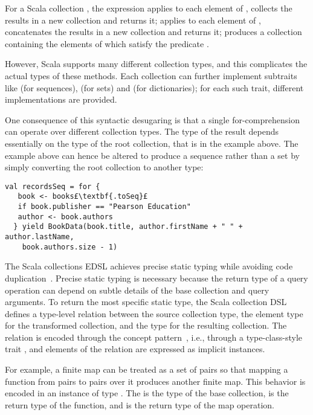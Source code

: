 For a Scala collection , the expression  applies  to each element of , collects the results in a new collection and returns it;  applies  to each element of , concatenates the results in a new collection and returns it;  produces a collection containing the elements of  which satisfy the predicate .

However, Scala supports many different collection types, and this complicates the actual types of these methods. Each collection can further implement subtraits like  (for sequences),  (for sets) and  (for dictionaries); for each such trait, different implementations are provided.

One consequence of this syntactic desugaring is that a single for-comprehension can operate over different collection types.
The type of the result depends essentially on the type of the root collection, that is  in the example above. The example above can hence be altered to produce a sequence rather than a set by simply converting the root collection to another type:
\begin{lstlisting}
val recordsSeq = for {
   book <- books£\textbf{.toSeq}£
   if book.publisher == "Pearson Education"
   author <- book.authors
  } yield BookData(book.title, author.firstName + " " + author.lastName,
    book.authors.size - 1)
\end{lstlisting}

The Scala collections EDSL achieves precise static typing while avoiding code duplication~\citep{odersky2009fighting}. Precise static typing is necessary because the return type of a query operation can depend on subtle details of the base collection and query arguments.
To return the most specific static type, the Scala collection DSL defines a type-level relation between the source collection type, the element type for the transformed collection, and the type for the resulting collection. The relation is encoded through the concept pattern~\citep{Oliveira10TCOI}, i.e., through a type-class-style trait , and elements of the relation are expressed as implicit instances.

For example, a finite map can be treated as a set of pairs so that mapping a function from pairs to pairs over it produces another finite map. This behavior is encoded in an instance of type \code{CanBuildFrom[Map[K, V], (K1, V1), Map[K1, V1]}. The  is the type of the base collection,  is the return type of the function, and  is the return type of the map operation.

